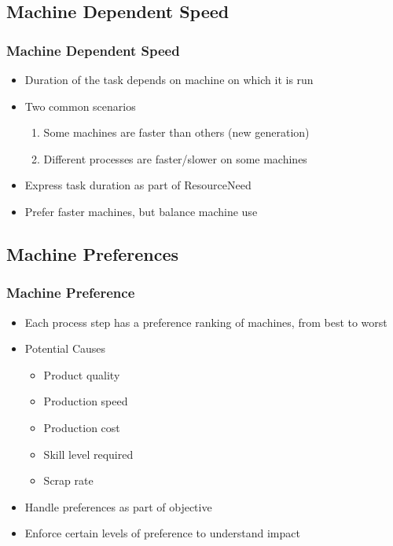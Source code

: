 \subsection{Machine Dependent Speed}

\begin{frame}
\frametitle{Machine Dependent Speed \soon}
\begin{itemize}
\item Duration of the task depends on machine on which it is run
\item Two common scenarios
\begin{enumerate}
\item Some machines are faster than others (new generation)
\item Different processes are faster/slower on some machines
\end{enumerate}
\item Express task duration as part of ResourceNeed
\item Prefer faster machines, but balance machine use
\end{itemize}
\end{frame}


\subsection{Machine Preferences}

\begin{frame}
\frametitle{Machine Preference \soon}
\begin{itemize}
\item Each process step has a preference ranking of machines, from best to worst
\item Potential Causes
\begin{itemize}
\item Product quality
\item Production speed
\item Production cost
\item Skill level required
\item Scrap rate
\end{itemize}
\item Handle preferences as part of objective
\item Enforce certain levels of preference to understand impact
\end{itemize}
\end{frame}

